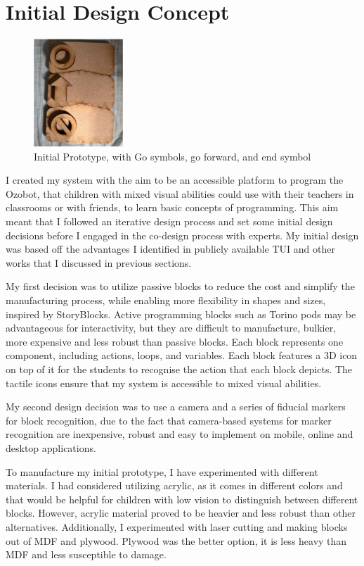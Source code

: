 \documentclass[oneside,%
                    author={Malak Hajji},
                    degree={BSc},
                    title={Designing An Accessible Computational Toolkit For Students},
                  subtitle={With Mixed Visual Abilities}]{dissertation}
\begin{document}
\section{Initial Design Concept}
\begin{figure}
    \centering
    \includegraphics[width=0.3\textwidth]{thesis/initial-block.eps}
    \caption{Initial Prototype, with Go symbols, go forward, and end symbol}
    \label{fig-initial}
\end{figure}
I created my system with the aim to be an accessible platform to program the Ozobot, that children with mixed visual abilities could use with their teachers in classrooms or with friends, to learn basic concepts of programming. This aim meant that I followed an iterative design process and set some initial design decisions before I engaged in the co-design process with experts. My initial design was based off the advantages I identified in publicly available TUI and other works that I discussed in previous sections.

My first decision was to utilize passive blocks to reduce the cost and simplify the manufacturing process, while enabling more flexibility in shapes and sizes, inspired by StoryBlocks\cite{storyblocks}.  Active programming blocks such as Torino pods may be advantageous for interactivity, but they are difficult to manufacture, bulkier, more expensive and less robust than passive blocks\cite{torino}.  Each block represents one component, including actions, loops, and variables. Each block features a 3D icon on top of it for the students to recognise the action that each block depicts. The tactile icons ensure that my system is accessible to mixed visual abilities.

My second design decision was to use a camera and a series of fiducial markers for block recognition, due to the fact that camera-based systems for marker recognition are inexpensive, robust and easy to implement on mobile, online and desktop applications.

To manufacture my initial prototype, I have experimented with different materials. I had considered utilizing acrylic, as it comes in different colors and that would be helpful for children with low vision to distinguish between different blocks. However, acrylic material proved to be heavier and less robust than other alternatives. Additionally, I experimented with laser cutting and making blocks out of MDF and plywood. Plywood was the better option, it is less heavy than MDF and less susceptible to damage. 
\end{document}
